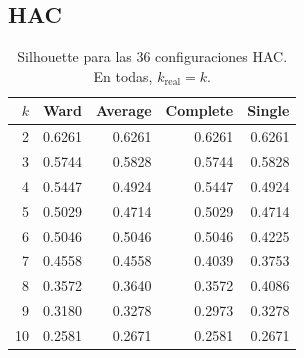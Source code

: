 \documentclass[11pt]{article}
\begin{document}
\subsection{HAC}
\begin{table}[htbp]
\centering\small
\caption{Silhouette para las 36 configuraciones HAC. En todas, $k_{\mathrm{real}}=k$.}\label{tab:hac}
\begin{tabular}{rrrrr}\toprule
$k$ & Ward & Average & Complete & Single \\ \midrule
2 & 0.6261 & 0.6261 & 0.6261 & 0.6261 \\
3 & 0.5744 & 0.5828 & 0.5744 & 0.5828 \\
4 & 0.5447 & 0.4924 & 0.5447 & 0.4924 \\
5 & 0.5029 & 0.4714 & 0.5029 & 0.4714 \\
6 & 0.5046 & 0.5046 & 0.5046 & 0.4225 \\
7 & 0.4558 & 0.4558 & 0.4039 & 0.3753 \\
8 & 0.3572 & 0.3640 & 0.3572 & 0.4086 \\
9 & 0.3180 & 0.3278 & 0.2973 & 0.3278 \\
10 & 0.2581 & 0.2671 & 0.2581 & 0.2671 \\
\bottomrule\end{tabular}
\end{table}
\end{document}
